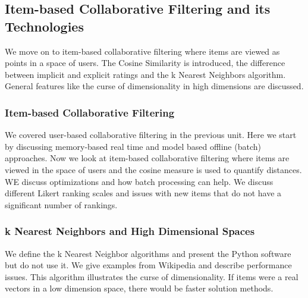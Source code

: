 \subsection{Item-based Collaborative Filtering and its
Technologies}\label{item-based-collaborative-filtering-and-its-technologies}

We move on to item-based collaborative filtering where items are viewed
as points in a space of users. The Cosine Similarity is introduced, the
difference between implicit and explicit ratings and the k Nearest
Neighbors algorithm. General features like the curse of dimensionality
in high dimensions are discussed.



\subsubsection{Item-based Collaborative
Filtering}\label{item-based-collaborative-filtering}

We covered user-based collaborative filtering in the previous unit. Here
we start by discussing memory-based real time and model based offline
(batch) approaches. Now we look at item-based collaborative filtering
where items are viewed in the space of users and the cosine measure is
used to quantify distances. WE discuss optimizations and how batch
processing can help. We discuss different Likert ranking scales and
issues with new items that do not have a significant number of rankings.




\subsubsection{k Nearest Neighbors and High Dimensional
Spaces}\label{k-nearest-neighbors-and-high-dimensional-spaces}

We define the k Nearest Neighbor algorithms and present the Python
software but do not use it. We give examples from Wikipedia and describe
performance issues. This algorithm illustrates the curse of
dimensionality. If items were a real vectors in a low dimension space,
there would be faster solution methods.



